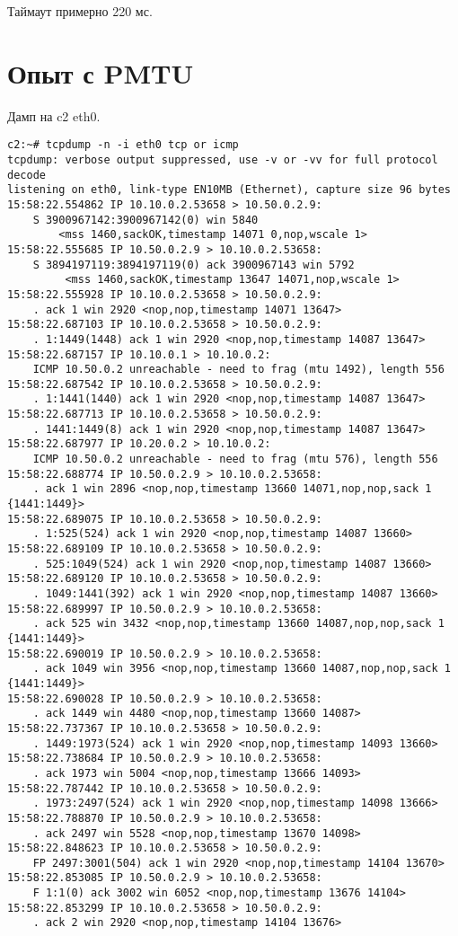\documentclass[a4paper,12pt]{article}
\begin{document}
Таймаут примерно 220 мс.

\section{Опыт с PMTU}

Дамп на c2 eth0.

\begin{Verbatim}
c2:~# tcpdump -n -i eth0 tcp or icmp
tcpdump: verbose output suppressed, use -v or -vv for full protocol decode
listening on eth0, link-type EN10MB (Ethernet), capture size 96 bytes
15:58:22.554862 IP 10.10.0.2.53658 > 10.50.0.2.9: 
    S 3900967142:3900967142(0) win 5840 
        <mss 1460,sackOK,timestamp 14071 0,nop,wscale 1>
15:58:22.555685 IP 10.50.0.2.9 > 10.10.0.2.53658: 
    S 3894197119:3894197119(0) ack 3900967143 win 5792
         <mss 1460,sackOK,timestamp 13647 14071,nop,wscale 1>
15:58:22.555928 IP 10.10.0.2.53658 > 10.50.0.2.9: 
    . ack 1 win 2920 <nop,nop,timestamp 14071 13647>
15:58:22.687103 IP 10.10.0.2.53658 > 10.50.0.2.9: 
    . 1:1449(1448) ack 1 win 2920 <nop,nop,timestamp 14087 13647>
15:58:22.687157 IP 10.10.0.1 > 10.10.0.2: 
    ICMP 10.50.0.2 unreachable - need to frag (mtu 1492), length 556
15:58:22.687542 IP 10.10.0.2.53658 > 10.50.0.2.9: 
    . 1:1441(1440) ack 1 win 2920 <nop,nop,timestamp 14087 13647>
15:58:22.687713 IP 10.10.0.2.53658 > 10.50.0.2.9: 
    . 1441:1449(8) ack 1 win 2920 <nop,nop,timestamp 14087 13647>
15:58:22.687977 IP 10.20.0.2 > 10.10.0.2: 
    ICMP 10.50.0.2 unreachable - need to frag (mtu 576), length 556
15:58:22.688774 IP 10.50.0.2.9 > 10.10.0.2.53658: 
    . ack 1 win 2896 <nop,nop,timestamp 13660 14071,nop,nop,sack 1 {1441:1449}>
15:58:22.689075 IP 10.10.0.2.53658 > 10.50.0.2.9: 
    . 1:525(524) ack 1 win 2920 <nop,nop,timestamp 14087 13660>
15:58:22.689109 IP 10.10.0.2.53658 > 10.50.0.2.9: 
    . 525:1049(524) ack 1 win 2920 <nop,nop,timestamp 14087 13660>
15:58:22.689120 IP 10.10.0.2.53658 > 10.50.0.2.9: 
    . 1049:1441(392) ack 1 win 2920 <nop,nop,timestamp 14087 13660>
15:58:22.689997 IP 10.50.0.2.9 > 10.10.0.2.53658: 
    . ack 525 win 3432 <nop,nop,timestamp 13660 14087,nop,nop,sack 1 {1441:1449}>
15:58:22.690019 IP 10.50.0.2.9 > 10.10.0.2.53658: 
    . ack 1049 win 3956 <nop,nop,timestamp 13660 14087,nop,nop,sack 1 {1441:1449}>
15:58:22.690028 IP 10.50.0.2.9 > 10.10.0.2.53658: 
    . ack 1449 win 4480 <nop,nop,timestamp 13660 14087>
15:58:22.737367 IP 10.10.0.2.53658 > 10.50.0.2.9: 
    . 1449:1973(524) ack 1 win 2920 <nop,nop,timestamp 14093 13660>
15:58:22.738684 IP 10.50.0.2.9 > 10.10.0.2.53658: 
    . ack 1973 win 5004 <nop,nop,timestamp 13666 14093>
15:58:22.787442 IP 10.10.0.2.53658 > 10.50.0.2.9: 
    . 1973:2497(524) ack 1 win 2920 <nop,nop,timestamp 14098 13666>
15:58:22.788870 IP 10.50.0.2.9 > 10.10.0.2.53658: 
    . ack 2497 win 5528 <nop,nop,timestamp 13670 14098>
15:58:22.848623 IP 10.10.0.2.53658 > 10.50.0.2.9: 
    FP 2497:3001(504) ack 1 win 2920 <nop,nop,timestamp 14104 13670>
15:58:22.853085 IP 10.50.0.2.9 > 10.10.0.2.53658: 
    F 1:1(0) ack 3002 win 6052 <nop,nop,timestamp 13676 14104>
15:58:22.853299 IP 10.10.0.2.53658 > 10.50.0.2.9: 
    . ack 2 win 2920 <nop,nop,timestamp 14104 13676>
\end{Verbatim}
\end{document}
